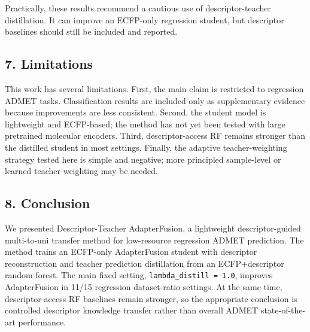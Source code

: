 \documentclass[
]{article}
\begin{document}
Practically, these results recommend a cautious use of
descriptor-teacher distillation. It can improve an ECFP-only regression
student, but descriptor baselines should still be included and reported.

\subsection{7. Limitations}\label{limitations}

This work has several limitations. First, the main claim is restricted
to regression ADMET tasks. Classification results are included only as
supplementary evidence because improvements are less consistent. Second,
the student model is lightweight and ECFP-based; the method has not yet
been tested with large pretrained molecular encoders. Third,
descriptor-access RF remains stronger than the distilled student in most
settings. Finally, the adaptive teacher-weighting strategy tested here
is simple and negative; more principled sample-level or learned teacher
weighting may be needed.

\subsection{8. Conclusion}\label{conclusion}

We presented Descriptor-Teacher AdapterFusion, a lightweight
descriptor-guided multi-to-uni transfer method for low-resource
regression ADMET prediction. The method trains an ECFP-only
AdapterFusion student with descriptor reconstruction and teacher
prediction distillation from an ECFP+descriptor random forest. The main
fixed setting, \texttt{lambda\_distill\ =\ 1.0}, improves AdapterFusion
in 11/15 regression dataset-ratio settings. At the same time,
descriptor-access RF baselines remain stronger, so the appropriate
conclusion is controlled descriptor knowledge transfer rather than
overall ADMET state-of-the-art performance.


\end{document}

